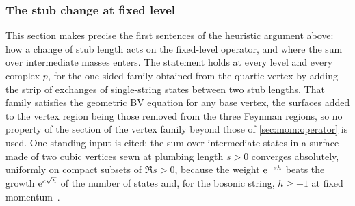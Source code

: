 \subsubsection{The stub change at fixed level}
\label{sec:mom:stub}


This section makes precise the first sentences of the heuristic argument above: how a change of stub length acts on the fixed-level operator, and where the sum over intermediate masses enters.
The statement holds at every level and every complex $p$, for the one-sided family obtained from the quartic vertex by adding the strip of exchanges of single-string states between two stub lengths.
That family satisfies the geometric BV equation for any base vertex, the surfaces added to the vertex region being those removed from the three Feynman regions, so no property of the section of the vertex family beyond those of \cref{sec:mom:operator} is used.
One standing input is cited: the sum over intermediate states in a surface made of two cubic vertices sewn at plumbing length $s > 0$ converges absolutely, uniformly on compact subsets of $\Re s > 0$, because the weight $\mathrm{e}^{- s h}$ beats the growth $\mathrm{e}^{c \sqrt{h}}$ of the number of states and, for the bosonic string, $h \ge -1$ at fixed momentum~\cite{deLacroix:2017:ClosedSuperstringField}.


